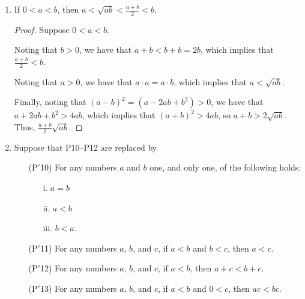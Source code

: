 \documentclass{amsart}
\begin{document}
\begin{enumerate}[1.]
\begin{enumerate}[(a)]
\begin{proof}
    Second, take $x<y$. This implies that $x^{n}<y^{n}$, contradicting our hypothesis.

    Thus, $x=y$.
  \end{proof}
\item If $x^{n}=y^{n}$ and $n$ is even, then $x=y$ or $x=-y$.
  \begin{proof}
    Suppose in all cases that $x^{n}=y^{n}$

    First, suppose $x, y \geq 0$.Suppose further that $x \neq y$. Without loss of generality, suppose $x>y$. This implies that $x^{n}>y^{n}$, contradicting our hypothesis (and likewise for $x<y$). Thus, when $x, y \geq 0$, $x=y$.

    Second, suppose $x, y \leq 0$. Suppose further that $x \neq y$. This implies that $-x, -y \geq 0$. $x \neq y$. Without loss of generality, suppose $-x>-y$. This implies that $(-x)^n>(-y)^{n}$, and since $n$ is even, $x^{n}>y^{n}$, contradicting our hypothesis. Thus, when $x, y \leq 0$, $x=y$.

    Third, suppose $x$ and $y$ are of opposite signs. Suppose $x \neq y$. Without loss of generality, suppose $x<0<y$. Thus, $0<-x,y$. Without loss of generality again, suppose $-x<y$. But then $(-x)^{n}=x^{n}<y^{n}$, contradicting our hypothesis. Thus, when $x$ and $y$ are of opposite signs, $x=-y$.
  \end{proof}
  \end{enumerate}

\item If $0<a<b$, then $a<\sqrt{ab}<\frac{a+b}{2}<b$.
  \begin{proof}
    Suppose $0<a<b$.

    Noting that $b>0$, we have that $a+b<b+b=2b$, which implies that $\frac{a+b}{2}<b$.

    Noting that $a>0$, we have that $a \cdot a = a \cdot b$, which implies that $a<\sqrt{ab}$.

    Finally, noting that $(a-b)^{2}=(a-2ab+b^{2})>0
    $, we have that $a+2ab+b^{2}>4ab$, which implies that $(a+b)^{2}>4ab$, so $a+b>2\sqrt{ab}$. Thus, $\frac{a+b}{2}\sqrt{ab}$.
  \end{proof}
\item Suppose that P10--P12 are replaced by
  \begin{enumerate}
\item[(P$'$10)] For any numbers $a$ and $b$ one, and only one, of
  the following holds:
  \begin{enumerate}
  \item[i.] $a=b$
  \item[ii.] $a<b$
  \item[iii.] $b<a$.
  \end{enumerate}
\item[(P$'$11)] For any numbers $a$, $b$, and $c$, if $a<b$ and $b<c$, then
  $a<c$.
\item[(P$'$12)] For any numbers $a$, $b$, and $c$, if $a<b$, then $a+c<b+c$.
\item[(P$'$13)] For any numbers $a$, $b$, and $c$, if $a<b$ and $0<c$,
  then $ac<bc$.
\end{enumerate}


\end{enumerate}
\end{document}
